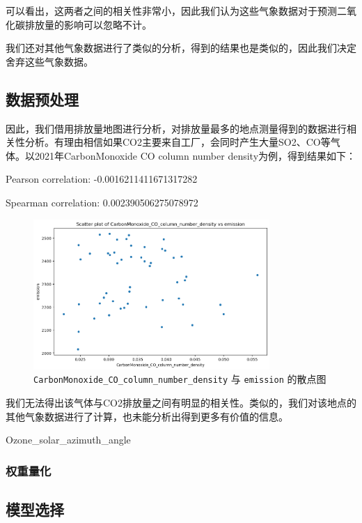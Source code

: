 \documentclass[fontset=windows]{article}
\begin{document}
可以看出，这两者之间的相关性非常小，因此我们认为这些气象数据对于预测二氧化碳排放量的影响可以忽略不计。

我们还对其他气象数据进行了类似的分析，得到的结果也是类似的，因此我们决定舍弃这些气象数据。

\subsection{数据预处理}

因此，我们借用排放量地图进行分析，对排放量最多的地点测量得到的数据进行相关性分析。有理由相信如果CO2主要来自工厂，会同时产生大量SO2、CO等气体。以2021年CarbonMonoxide CO column number density为例，得到结果如下：

\begin{center}
      Pearson correlation: -0.0016211411671317282

      Spearman correlation: 0.002390506275078972
\end{center}

\begin{figure}[H]
      \centering
      \includegraphics[width=0.8\textwidth]{output7.png}
      \caption{\texttt{CarbonMonoxide\_CO\_column\_number\_density} 与 \texttt{emission} 的散点图}
\end{figure}

我们无法得出该气体与CO2排放量之间有明显的相关性。类似的，我们对该地点的其他气象数据进行了计算，也未能分析出得到更多有价值的信息。

Ozone\_solar\_azimuth\_angle

\subsubsection{权重量化}

\subsection{模型选择}
\end{document}
